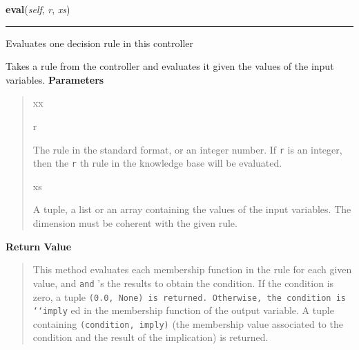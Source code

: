     \vspace{0.5ex}

\hspace{.8\funcindent}\begin{boxedminipage}{\funcwidth}

    \raggedright \textbf{eval}(\textit{self}, \textit{r}, \textit{xs})

    \vspace{-1.5ex}

    \rule{\textwidth}{0.5\fboxrule}
\setlength{\parskip}{2ex}

Evaluates one decision rule in this controller

Takes a rule from the controller and evaluates it given the values of
the input variables.
\setlength{\parskip}{1ex}
      \textbf{Parameters}
      \vspace{-1ex}

      \begin{quote}
        \begin{Ventry}{xx}

          \item[r]


The rule in the standard format, or an integer number. If \texttt{r} is
an integer, then the \texttt{r} th rule in the knowledge base will be
evaluated.
          \item[xs]


A tuple, a list or an array containing the values of the input
variables. The dimension must be coherent with the given rule.
        \end{Ventry}

      \end{quote}

      \textbf{Return Value}
    \vspace{-1ex}

      \begin{quote}

This method evaluates each membership function in the rule for each
given value, and \texttt{and} 's the results to obtain the condition. If
the condition is zero, a tuple \texttt{(0.0, None) is returned. Otherwise,
the condition is `{}`imply} ed in the membership function of the output
variable. A tuple containing \texttt{(condition, imply)} (the membership
value associated to the condition and the result of the implication)
is returned.
      \end{quote}

    \end{boxedminipage}

